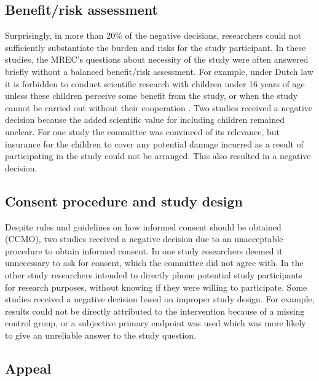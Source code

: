 \documentclass[authordate, empirical]{jote-new-article}
\begin{document}
	\subsection{Benefit/risk assessment}



	Surprisingly, in more than 20\% of the negative decisions, researchers could not sufficiently substantiate the burden and risks for the study participant. In these studies, the MREC's questions about necessity of the study were often answered briefly without a balanced benefit/risk assessment. For example, under Dutch law it is forbidden to conduct scientific research with children under 16 years of age unless these children perceive some benefit from the study, or when the study cannot be carried out without their cooperation \parencites{NederlandseOverheid2022}. Two studies received a negative decision because the added scientific value for including children remained unclear. For one study the committee was convinced of its relevance, but insurance for the children to cover any potential damage incurred as a result of participating in the study could not be arranged. This also resulted in a negative decision.







	\subsection{Consent procedure and study design}



	Despite rules and guidelines on how informed consent should be obtained (CCMO), two studies received a negative decision due to an unacceptable procedure to obtain informed consent. In one study researchers deemed it unnecessary to ask for consent, which the committee did not agree with. In the other study researchers intended to directly phone potential study participants for research purposes, without knowing if they were willing to participate. Some studies received a negative decision based on improper study design. For example, results could not be directly attributed to the intervention because of a missing control group, or a subjective primary endpoint was used which was more likely to give an unreliable answer to the study question.





	\subsection{Appeal}
\end{document}
